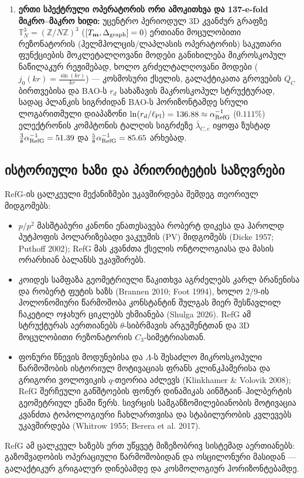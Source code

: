\documentclass[11pt,a4paper]{article}
\begin{document}
\begin{enumerate}[label=\arabic*.]
\item \textbf{ერთი სპექტრული ოპერატორის ორი ამოკითხვა და 137-e-fold მიკრო–მაკრო ხიდი:} უცენტრო პერიოდულ 3D კვანძურ გრაფზე $\mathbb{T}^3_N = (\mathbb{Z}/N\mathbb{Z})^3$ ($[T_{\mathbf{m}}, \Delta_{\rm graph}] = 0$) ერთიანი მოცულობითი რეზონატორის (ჰელმჰოლცის/ლაპლასის ოპერატორის) საკუთარი ფუნქციების მოკლეტალღოვანი მოდები განიხილება მიკროსკოპულ ნაწილაკურ რეჟიმებად, ხოლო გრძელტალღოვანი მოდები ($j_0(kr) = \frac{\sin(kr)}{kr}$) — კოსმოსური ქსელის, გალაქტიკათა გროვების $Q_C$ ბირთვებისა და BAO-ს $r_d$ სახაზავის მაკროსკოპულ სტრუქტურად, სადაც პლანკის სიგრძიდან BAO-ს ჰორიზონტამდე სრული ლოგარითმული დიაპაზონი $\ln(r_d/\ell_{\rm Pl}) = 136.88 \approx \alpha_{\rm RefG}^{-1}$ ($0.111\%$) ელექტრონის კომპტონის ტალღის სიგრძეზე $\bar{\lambda}_{C,e}$ იყოფა ზუსტად $\frac{3}{8}\alpha_{\rm RefG}^{-1} = 51.39$ და $\frac{5}{8}\alpha_{\rm RefG}^{-1} = 85.65$ არხებად.

\end{enumerate}
\subsection*{ისტორიული ხაზი და პრიორიტეტის საზღვრები}

RefG-ის ცალკეული მექანიზმები უკავშირდება შემდეგ თეორიულ მიდგომებს:

\begin{itemize}
\item $p/p^2$ მასშტაბური კანონი ენათესავება რობერტ დიკესა და ჰაროლდ პუტჰოფის პოლარიზებადი ვაკუუმის (PV) მიდგომებს (Dicke 1957; Puthoff 2002); RefG მას კვანძთა ქსელის ონტოლოგიასა და მასის ორარხიან ბალანსს უკავშირებს.
\item კოიდეს სამფაზა გეომეტრიული წაკითხვა აგრძელებს კარლ ბრანენისა და რობერტ ფუტის ხაზს (Brannen 2010; Foot 1994), ხოლო $2/9$-ის ჰოლონომიური წარმოშობა კონსტანტინ შულგას მიერ შესწავლილ ჩაკეტილ ოჯახურ ციკლებს ეხმიანება (Shulga 2026). RefG ამ სტრუქტურას აერთიანებს $\theta$-სიბრმავის არგუმენტთან და 3D მოცულობითი რეზონატორის $C_3$-სიმეტრიასთან.
\item ფონური წნევის მოდუნებისა და $\Lambda$-ს შესაძლო მიკროსკოპული წარმოშობის ისტორიულ მოტივაციას ფრანს კლინკჰამერისა და გრიგორი ვოლოვიკის $q$-თეორია აძლევს (Klinkhamer \& Volovik 2008); RefG შერჩეული განშტოების ფონურ დინამიკას აინშტაინ–ჰილბერტის გეომეტრიულ ენაში წერს. სივრცის სამგანზომილებიანობის მოტივაცია კვანძთა ტოპოლოგიური ჩახლართვისა და სტაბილურობის კვლევებს უკავშირდება (Whitrow 1955; Berera et al. 2017).

\end{itemize}
RefG ამ ცალკეულ ხაზებს ერთ უწყვეტ მიზეზობრივ სისტემად აერთიანებს: გაზომვადობის ოპერაციული წარმოშობიდან და ოსცილონური მასიდან — გალაქტიკურ გრიგალურ დინებამდე და კოსმოლოგიურ ჰორიზონტებამდე.
\end{document}
